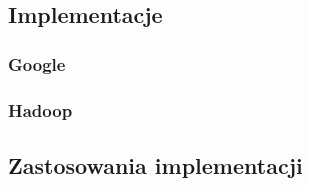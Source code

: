 \subsection{Implementacje}

\subsubsection{Google}
\label{ssub:google}

\subsubsection{Hadoop}
\label{ssub:hadoop}

\subsection{Zastosowania implementacji}


